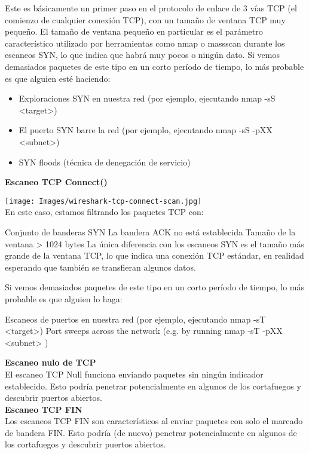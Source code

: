 Este es básicamente un primer paso en el protocolo de enlace de 3 vías TCP (el comienzo de cualquier conexión TCP), con un tamaño de ventana TCP muy pequeño. 
El tamaño de ventana pequeño en particular es el parámetro característico utilizado por herramientas como nmap o massscan durante los escaneos SYN, lo que indica que habrá muy pocos o ningún dato.
Si vemos demasiados paquetes de este tipo en un corto período de tiempo, lo más probable es que alguien esté haciendo:
\begin{itemize}
    \item Exploraciones SYN en nuestra red (por ejemplo, ejecutando nmap -sS <target>)
\item El puerto SYN barre la red (por ejemplo, ejecutando nmap -sS -pXX <subnet>)
\item SYN floods (técnica de denegación de servicio)
\end{itemize}




\textbf{Escaneo TCP Connect()}		

\texttt{[image: Images/wireshark-tcp-connect-scan.jpg]}\\
En este caso, estamos filtrando los paquetes TCP con:

Conjunto de banderas SYN
La bandera ACK no está establecida
Tamaño de la ventana > 1024 bytes
La única diferencia con los escaneos SYN es el tamaño más grande de la ventana TCP, lo que indica una conexión TCP estándar, en realidad esperando que también se transfieran algunos datos.

Si vemos demasiados paquetes de este tipo en un corto período de tiempo, lo más probable es que alguien lo haga:

Escaneos de puertos en nuestra red (por ejemplo, ejecutando nmap -sT <target>)
Port sweeps across the network (e.g. by running nmap -sT -pXX <subnet> )








\textbf{Escaneo nulo de TCP}		\\
El escaneo TCP Null funciona enviando paquetes sin ningún indicador establecido. Esto podría penetrar potencialmente en algunos de los cortafuegos y descubrir puertos abiertos.\\


\textbf{Escaneo TCP FIN}		\\
Los escaneos TCP FIN son característicos al enviar paquetes con solo el marcado de bandera FIN. Esto podría (de nuevo) penetrar potencialmente en algunos de los cortafuegos y descubrir puertos abiertos.\\



